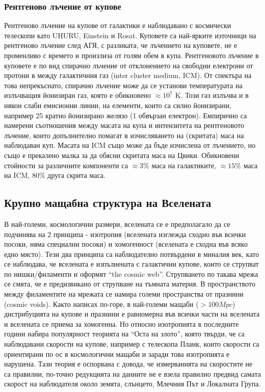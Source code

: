 \documentclass[a4paper,12pt]{article}
\begin{document}
\subsubsection{Рентгеново лъчение от купове}
Рентгеново лъчение на купове от галактики е наблюдавано с космически телескопи като UHURU, Einstein и Rosat. Куповете са най-ярките източници на рентгеново лъчение след АГЯ, с разликата, че лъчението на куповете, не е променливо с времето и произлиза от голям обем в купа. Рентгеновото лъчение в куповете е по вид спирачно лъчение от отклонението на свободни електрони от протони в между галактичния газ (inter cluster medium, ICM). От спектъра на това непрекъснато, спирачно лъчение може да се установи температурата на излъчващия йонизиран газ, която е обикновено $\approx 10^7$ K. Този газ излъчва и в някои слаби емисионни линии, на елементи, които са силно йонизирани, например 25 кратно йонизирано желязо (1 обвързан електрон). Емпирично са намерени съотношения между масата на купа и интензитета на рентгеновото лъчение, които допълнително помагат в изчисляването на (скритата) маса на наблюдаван куп. Масата на ICM също може да бъде изчислена от лъчението, но също е прекалено малка за да обясни скритата маса на Цвики. Обикновени стойности за различните компоненти са $\approx 3\%$ маса на галактиките, $\approx 15\%$ маса на ICM, $80\%$ друга скрита маса.


\subsection{Крупно мащабна структура на Вселената}
В най-големи, космологични размери, вселената се е предполагало да се подчинява на 2 принципа - изотропия (вселената изглежда сходно във всички посоки, няма специални посоки) и хомогенност (вселената е сходна във всяко едно място). Тези два принципа са наблюдателно потвърдени в миналия век, като се наблюдава, че вселената е изпълнената с галактични купове, които се струпват по нишки/филаменти и оформят ``the cosmic web''. Струпването по такава мрежа се смята, че е предизвикано от струпване на тъмната материя. В пространството между филаментите на мрежата се намира големи пространства от празнини (cosmic voids). Както написах по-горе, в най-големи мащаби ($> 100 Mpc$) дистрибуцията на купове и празнини е равномерна във всички части на вселената и вселената се приема за хомогенна. Но относно изотропията в последните години набира популярност теорията на ``Оста на злото'', която твърди, че са наблюдавани скорости на купове, например с телескопа Планк, които скорости са ориентирани по ос в космологични мащаби и заради това изотропията е нарушена. Тази теория е оспорвана с довода, че измерванията на скоростите не са правилни, по-точно редукцията на данните не е взела правилно предвид самата скорост на наблюдателя около земята, слънцето, Млечния Път и Локалната Група.\\
\end{document}

